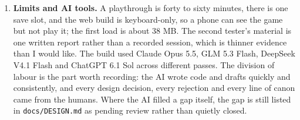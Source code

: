 \documentclass[12pt,a4paper]{article}
\begin{document}
\begin{enumerate}
  \item \textbf{Limits and AI tools.} A playthrough is forty to sixty minutes,
  there is one save slot, and the web build is keyboard-only, so a phone can see the
  game but not play it; the first load is about 38 MB. The second tester's material
  is one written report rather than a recorded session, which is thinner evidence
  than I would like. The build used Claude Opus 5.5, GLM 5.3 Flash, DeepSeek V4.1
  Flash and ChatGPT 6.1 Sol across different passes. The division of labour is the
  part worth recording: the AI wrote code and drafts quickly and consistently, and
  every design decision, every rejection and every line of canon came from the
  humans. Where the AI filled a gap itself, the gap is still listed in
  \texttt{docs/DESIGN.md} as pending review rather than quietly closed.
\end{enumerate}

\singlespacing
\small
\printbibliography[title={Bibliography}]
\end{document}
